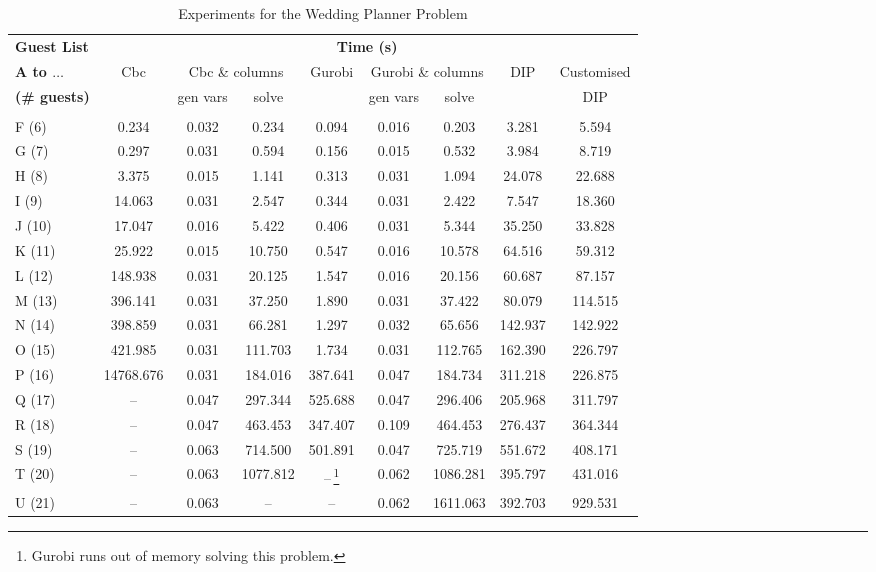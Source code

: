 \begin{table}[htp]
\begin{minipage}[l]{\textwidth}
\begin{small}
\begin{tabular}{|l@{\,}|c@{\ }c@{\ }c@{\ }c@{\ }c@{\ }c@{\ }c@{\ }c@{\,}|}
\hline
\textbf{Guest List} & \multicolumn{8}{|c|}{\textbf{Time (s)}} \\
\textbf{A to $\ldots$} & Cbc & \multicolumn{2}{c}{Cbc \& columns} & Gurobi & \multicolumn{2}{c}{Gurobi \& columns} & \ac{DIP} & Customised \\
\textbf{(\# guests)} & & gen vars & solve & & gen vars & solve & & \ac{DIP} \\ \hline & & & & \\[-10pt]
F	(6) &     0.234&     0.032&     0.234&     0.094&     0.016&     0.203&     3.281&     5.594 \\
G	(7) &     0.297&     0.031&     0.594&     0.156&     0.015&     0.532&     3.984&     8.719 \\
H	(8) &     3.375&     0.015&     1.141&     0.313&     0.031&     1.094&    24.078&    22.688 \\
I	(9) &    14.063&     0.031&     2.547&     0.344&     0.031&     2.422&     7.547&    18.360 \\
J	(10)&   17.047 &    0.016 &    5.422 &    0.406 &    0.031 &    5.344 &   35.250 &   33.828  \\
K	(11)&   25.922 &    0.015 &   10.750 &    0.547 &    0.016 &   10.578 &   64.516 &   59.312  \\
L	(12)&  148.938 &    0.031 &   20.125 &    1.547 &    0.016 &   20.156 &   60.687 &   87.157  \\
M	(13)&  396.141 &    0.031 &   37.250 &    1.890 &    0.031 &   37.422 &   80.079 &  114.515  \\
N	(14)&  398.859 &    0.031 &   66.281 &    1.297 &    0.032 &   65.656 &  142.937 &  142.922  \\
O	(15)&  421.985 &    0.031 &  111.703 &    1.734 &    0.031 &  112.765 &  162.390 &  226.797  \\
P	(16)&14768.676 &    0.031 &  184.016 &  387.641 &    0.047 &  184.734 &  311.218 &  226.875  \\
Q	(17)&      -- &    0.047 &  297.344 &  525.688 &    0.047 &  296.406 &  205.968 &  311.797  \\
R	(18)&      -- &    0.047 &  463.453 &  347.407 &    0.109 &  464.453 &  276.437 &  364.344  \\
S	(19)&      -- &    0.063 &  714.500 &  501.891 &    0.047 &  725.719 &  551.672 &  408.171  \\
T	(20)&      -- &    0.063 & 1077.812 &      --\,\footnote{Gurobi runs out of memory solving this problem.} &    0.062 & 1086.281 &  395.797 &  431.016  \\
U	(21)&      -- &    0.063 &      -- &      -- &    0.062 & 1611.063 &  392.703 &  929.531
\end{tabular}
\end{small}
\end{minipage}
\caption{Experiments for the Wedding Planner Problem} \label{tab:wed_exp}
\end{table}
